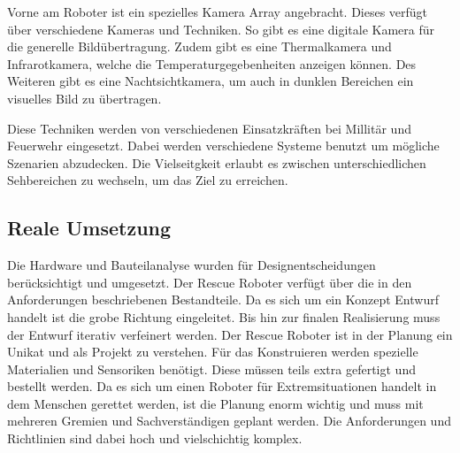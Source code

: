 Vorne am Roboter ist ein spezielles Kamera Array angebracht. Dieses verfügt über verschiedene Kameras und Techniken.  
So gibt es eine digitale Kamera für die generelle Bildübertragung. Zudem gibt es eine Thermalkamera und Infrarotkamera, welche die Temperaturgegebenheiten anzeigen können. 
Des Weiteren gibt es eine Nachtsichtkamera, um auch in dunklen Bereichen ein visuelles Bild zu übertragen. 

Diese Techniken werden von verschiedenen Einsatzkräften bei Millitär und Feuerwehr eingesetzt. Dabei werden verschiedene Systeme benutzt um mögliche Szenarien abzudecken. Die Vielseitgkeit erlaubt es zwischen unterschiedlichen Sehbereichen zu wechseln, um das Ziel zu erreichen.

\subsection {Reale Umsetzung} 
Die Hardware und Bauteilanalyse wurden für Designentscheidungen berücksichtigt und umgesetzt.
Der Rescue Roboter verfügt über die in den Anforderungen beschriebenen Bestandteile.
Da es sich um ein Konzept Entwurf handelt ist die grobe Richtung eingeleitet. 
Bis hin zur finalen Realisierung muss der Entwurf iterativ verfeinert werden.
Der Rescue Roboter ist in der Planung ein Unikat und als Projekt zu verstehen.
Für das Konstruieren werden spezielle Materialien und Sensoriken benötigt.
Diese müssen teils extra gefertigt und bestellt werden. 
Da es sich um einen Roboter für Extremsituationen handelt in dem Menschen gerettet werden, ist die Planung enorm wichtig und muss mit mehreren Gremien und Sachverständigen geplant werden.
Die Anforderungen und Richtlinien sind dabei hoch und vielschichtig komplex.  




